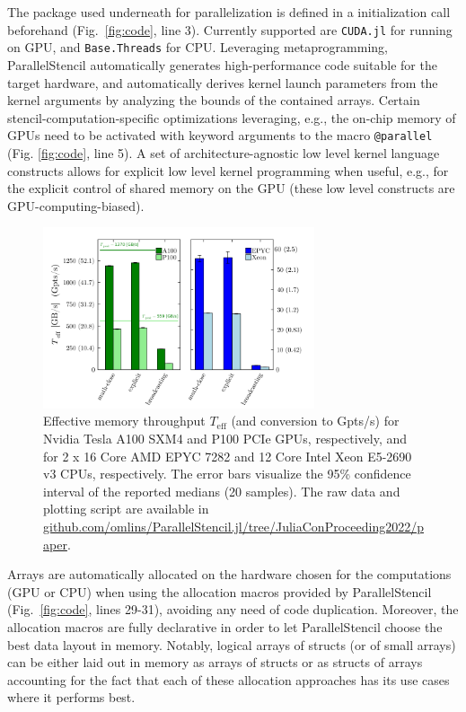 \documentclass{juliacon}
\begin{document}
The package used underneath for parallelization is defined in a initialization call beforehand (Fig.~\ref{fig:code}, line 3). Currently supported are \texttt{CUDA.jl} \cite{besard2018effective} for running on GPU, and \texttt{Base.Threads} for CPU. Leveraging metaprogramming, ParallelStencil automatically generates high-performance code suitable for the target hardware, and automatically derives kernel launch parameters from the kernel arguments by analyzing the bounds of the contained arrays. Certain stencil-computation-specific optimizations leveraging, e.g., the on-chip memory of GPUs need to be activated with keyword arguments to the macro \texttt{@parallel} (Fig. \ref{fig:code}, line 5). A set of architecture-agnostic low level kernel language constructs allows for explicit low level kernel programming when useful, e.g., for the explicit control of shared memory on the GPU (these low level constructs are GPU-computing-biased). 

\begin{figure}[t]
    \centerline{\includegraphics[width=8cm]{julia_xpu_Teff.png}}
    \caption{Effective memory throughput $T_\mathrm{eff}$ (and conversion to Gpts/s) for Nvidia Tesla A100 SXM4 and P100 PCIe GPUs, respectively, and for 2 x 16 Core AMD EPYC 7282 and 12 Core Intel Xeon E5-2690 v3 CPUs, respectively. The error bars visualize the 95\% confidence interval of the reported medians (20 samples). The raw data and plotting script are available in \url{github.com/omlins/ParallelStencil.jl/tree/JuliaConProceeding2022/paper}.}
	\label{fig:performance}
\end{figure}

Arrays are automatically allocated on the hardware chosen for the computations (GPU or CPU) when using the allocation macros provided by ParallelStencil (Fig.~\ref{fig:code}, lines 29-31), avoiding any need of code duplication. Moreover, the allocation macros are fully declarative in order to let ParallelStencil choose the best data layout in memory. Notably, logical arrays of structs (or of small arrays) can be either laid out in memory as arrays of structs or as structs of arrays accounting for the fact that each of these allocation approaches has its use cases where it performs best.
\end{document}
